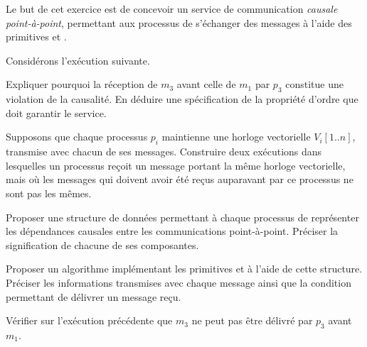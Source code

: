 
\begingroup


\begin{exercice}

  Le but de cet exercice est de concevoir un service de communication
  \emph{causale point-à-point}, permettant aux processus de s'échanger des
  messages à l'aide des primitives \csend et \crec.

  \begin{questions}
  \item Considérons l'exécution suivante.

    \begin{center}
    \end{center}

    Expliquer pourquoi la réception de $m_3$ avant celle de $m_1$ par $p_3$
    constitue une violation de la causalité.
    En déduire une spécification de la propriété d'ordre que doit garantir
    le service.

  \item Supposons que chaque processus $p_i$ maintienne une horloge vectorielle
    $V_i[1..n]$, transmise avec chacun de ses messages.
    Construire deux exécutions dans lesquelles un processus reçoit un message
    portant la même horloge vectorielle, mais où les messages qui doivent avoir
    été reçus auparavant par ce processus ne sont pas les mêmes.

  \item Proposer une structure de données permettant à chaque processus de
    représenter les dépendances causales entre les communications point-à-point.
    Préciser la signification de chacune de ses composantes.

  \item Proposer un algorithme implémentant les primitives \csend et \crec
    à l'aide de cette structure.
    Préciser les informations transmises avec chaque message ainsi que la
    condition permettant de délivrer un message reçu.

  \item Vérifier sur l'exécution précédente que $m_3$ ne peut pas être délivré
    par $p_3$ avant $m_1$.

  \end{questions}

\end{exercice}

\endgroup
\endinput
